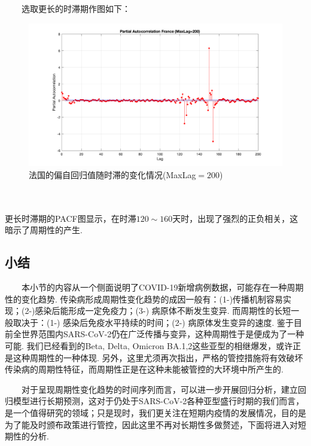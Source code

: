 \documentclass[a4paper, titlepage]{article}
\begin{document}
　　选取更长的时滞期作图如下：\\
\begin{minipage}{\textwidth}
    \begin{figure}[H]
        \centering
        \includegraphics[width=\textwidth]{./images/France_PACF_2.png}
        \vspace{-3em}
        \caption{法国的偏自回归值随时滞的变化情况(MaxLag$=200$)}
        \label{images:France_ACF}
    \end{figure}
\end{minipage}\\\quad\\
更长时滞期的PACF图显示，在时滞$120\sim 160$天时，出现了强烈的正负相关，这暗示了周期性的产生.
\subsection{小结}
　　本小节的内容从一个侧面说明了COVID-19新增病例数据，可能存在一种周期性的变化趋势. 传染病形成周期性变化趋势的成因一般有：(1-)传播机制容易实现；(2-)感染后能形成一定免疫力；(3-) 病原体不断发生变异. 而周期性的长短一般取决于：(1-) 感染后免疫水平持续的时间；(2-) 病原体发生变异的速度. 鉴于目前全世界范围内SARS-CoV-2仍在广泛传播与变异，这种周期性于是便成为了一种可能. 我们已经看到的Beta, Delta, Omicron BA.1,2这些亚型的相继爆发，或许正是这种周期性的一种体现. 另外，这里尤须再次指出，严格的管控措施将有效破坏传染病的周期性特征，而周期性正是在这种未能被管控的大环境中所产生的.

　　对于呈现周期性变化趋势的时间序列而言，可以进一步开展回归分析，建立回归模型进行长期预测，这对于仍处于SARS-CoV-2各种亚型盛行时期的我们而言，是一个值得研究的领域；只是现时，我们更关注在短期内疫情的发展情况，目的是为了能及时颁布政策进行管控，因此这里不再对长期性多做赘述，下面将进入对短期性的分析.

    \newpage
\end{document}
